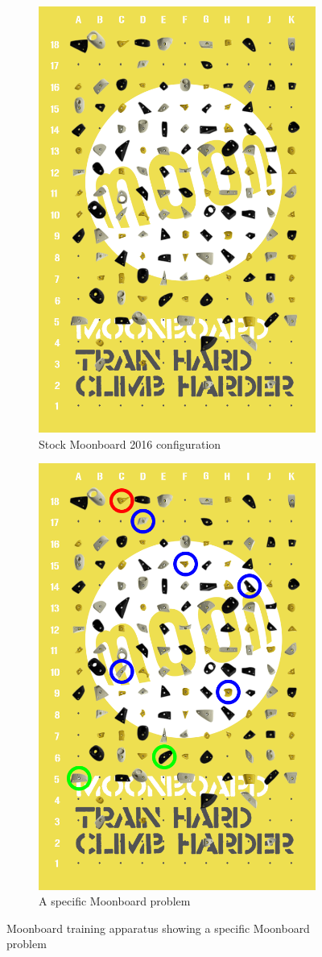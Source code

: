 \documentclass{article}
\begin{document}
\begin{figure}
\centering
\begin{subfigure}{.48\textwidth}
  \centering
  \includegraphics[width=.6\linewidth]{moonboard_stock}
  \caption{Stock Moonboard 2016 configuration}
  \label{fig: Stock Moonboard}
\end{subfigure}
\begin{subfigure}{.48\textwidth}
  \centering
  \includegraphics[width=.6\linewidth]{moonboard_1}
  \caption{A specific Moonboard problem}
  \label{fig: Moonboard Problem}
\end{subfigure}
\caption{Moonboard training apparatus showing a specific Moonboard problem}
\end{figure}
\end{document}
